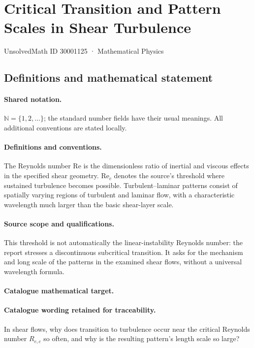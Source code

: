 \documentclass[11pt]{article}
\begin{document}
\setcounter{section}{30001124}
\section{Critical Transition and Pattern Scales in Shear Turbulence}\label{30001125}
{\small UnsolvedMath ID 30001125 · Mathematical Physics}
\subsection{Definitions and mathematical statement}

\paragraph{Shared notation.}$\mathbb N=\{1,2,\ldots\}$; the standard number fields have their usual meanings. All additional conventions are stated locally.


\paragraph{Definitions and conventions.} The Reynolds number $\mathrm{Re}$ is the dimensionless ratio of inertial and viscous effects in the specified shear geometry. $\mathrm{Re}_c$ denotes the source's threshold where sustained turbulence becomes possible. Turbulent--laminar patterns consist of spatially varying regions of turbulent and laminar flow, with a characteristic wavelength much larger than the basic shear-layer scale.

\paragraph{Source scope and qualifications.} This threshold is not automatically the linear-instability Reynolds number: the report stresses a discontinuous subcritical transition. It asks for the mechanism and long scale of the patterns in the examined shear flows, without a universal wavelength formula.

\paragraph{Catalogue mathematical target.}
\paragraph{Catalogue wording retained for traceability.}
In shear flows, why does transition to turbulence occur near the critical Reynolds number $R_{e,c}$ so often, and why is the resulting pattern's length scale so large?
\end{document}
